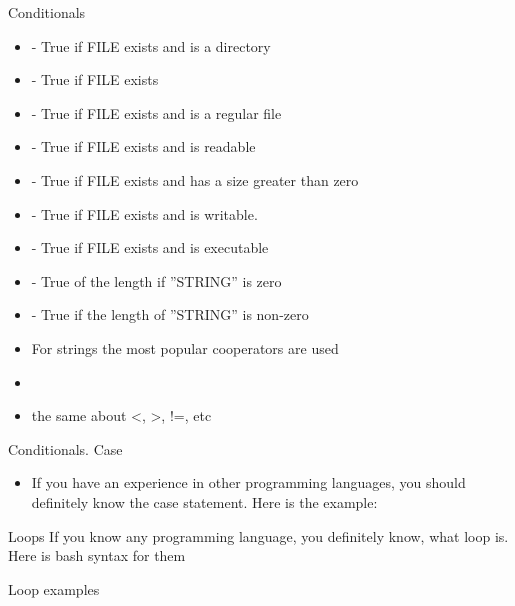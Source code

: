 \documentclass[usenames,dvipsnames,10pt,aspectratio=169]{beamer}
\begin{document}
\begin{frame}{Conditionals}
    \begin{itemize}
        \item \ex{[-d FILE]} - True if FILE exists and is a directory
        \item \ex{[-e FILE]} - True if FILE exists
        \item \ex{[-f FILE]} - True if FILE exists and is a regular file
        \item \ex{[-r FILE]} - True if FILE exists and is readable
        \item \ex{[-s FILE]} -  True if FILE exists and has a size greater than zero
        \item \ex{[-w FILE]} - True if FILE exists and is writable.
        \item \ex{[-x FILE]} -  True if FILE exists and is executable
        \item \ex{[-z STRING]} - True of the length if ”STRING” is zero
        \item \ex{[-n STRING]} - True if the length of ”STRING” is non-zero
        \item For strings the most popular cooperators are used
        \item \ex{[[ ]STRING1 == STRING2 ]]} 
        \item the same about <, >, !=, etc
    \end{itemize}
\end{frame}

\begin{frame}{Conditionals. Case}
    \begin{itemize}
        \item If you have an experience in other programming languages, you should definitely know the case statement. Here is the example:
        
    \end{itemize}
\end{frame}

\begin{frame}{Loops}
    If you know any programming language, you definitely know, what loop is. Here is bash syntax for them
    
    
    
\end{frame}

\begin{frame}{Loop examples}
    
    
\end{frame}
\end{document}
